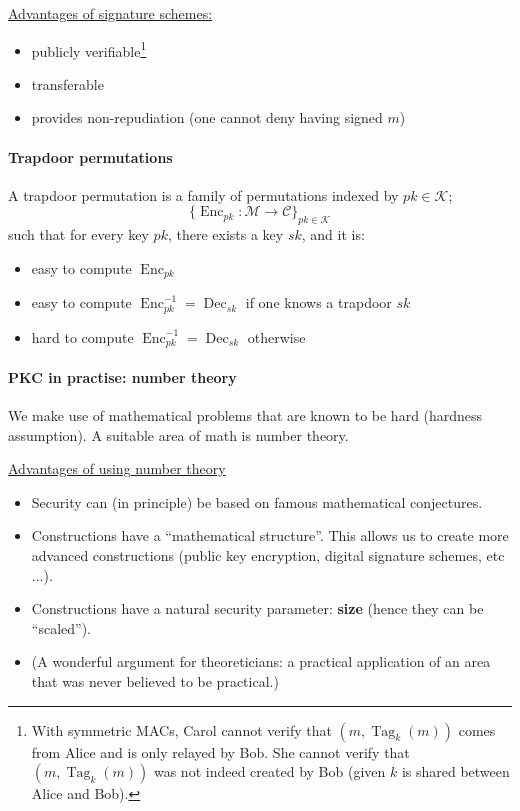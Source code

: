 \underline{Advantages of signature schemes:}

\begin{itemize}
    \item publicly verifiable\footnote{With symmetric MACs, Carol cannot verify that $(m, \operatorname{Tag}_k(m))$ comes from Alice and is only relayed by Bob. She cannot verify that $(m, \operatorname{Tag}_k(m))$ was not indeed created by Bob (given $k$ is shared between Alice and Bob).}
    \item transferable
    \item provides non-repudiation (one cannot deny having signed $m$)
\end{itemize}

\paragraph{Trapdoor permutations} A trapdoor permutation is a family of permutations indexed by $pk \in \mathcal{K}$;
$$ \{\operatorname{Enc}_{pk}: \mathcal{M} \rightarrow \mathcal{C}\}_{pk \in \mathcal{K}} $$
such that for every key $pk$, there exists a key $sk$, and it is:
\begin{itemize}
    \item easy to compute $\operatorname{Enc}_{pk}$
    \item easy to compute $\operatorname{Enc}_{pk}^{-1} = \operatorname{Dec}_{sk}$ if one knows a trapdoor $sk$
    \item hard to compute $\operatorname{Enc}_{pk}^{-1} = \operatorname{Dec}_{sk}$ otherwise
\end{itemize}

\paragraph{PKC in practise: number theory} We make use of mathematical problems that are known to be hard (hardness assumption). A suitable area of math is number theory.

\underline{Advantages of using number theory}

\begin{itemize}
    \item Security can (in principle) be based on famous mathematical conjectures.
    \item Constructions have a “mathematical structure”. This allows us to create more advanced constructions (public key encryption, digital signature schemes, etc ...).
    \item Constructions have a natural security parameter: \textbf{size} (hence they can be “scaled”).
    \item (A wonderful argument for theoreticians: a practical application of an area that was never believed to be practical.)
\end{itemize}

